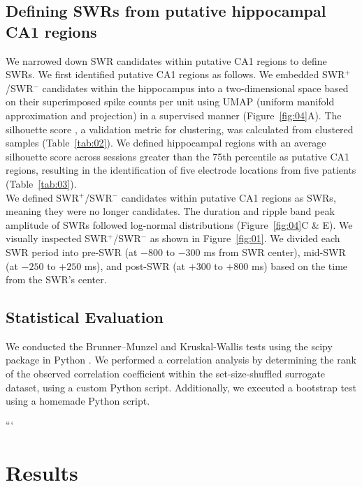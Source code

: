 \documentclass[final,3p,times,twocolumn]{elsarticle}
\begin{document}
\subsection{Defining SWRs from putative hippocampal CA1 regions}
We narrowed down SWR candidates within putative CA1 regions to define SWRs. We first identified putative CA1 regions as follows. We embedded SWR$^+$/SWR$^-$ candidates within the hippocampus into a two-dimensional space based on their superimposed spike counts per unit using UMAP (uniform manifold approximation and projection) \cite{mcinnes_umap_2018} in a supervised manner (Figure~\ref{fig:04}A). The silhouette score \cite{rousseeuw_silhouettes_1987}, a validation metric for clustering, was calculated from clustered samples (Table~\ref{tab:02}). We defined hippocampal regions with an average silhouette score across sessions greater than the 75th percentile as putative CA1 regions, resulting in the identification of five electrode locations from five patients (Table~\ref{tab:03}).
\\
\indent
We defined SWR$^+$/SWR$^-$ candidates within putative CA1 regions as SWRs, meaning they were no longer candidates. The duration and ripple band peak amplitude of SWRs followed log-normal distributions (Figure~\ref{fig:04}C \& E). We visually inspected SWR$^+$/SWR$^-$ as shown in Figure~\ref{fig:01}. We divided each SWR period into pre-SWR (at $-800$ to $-300$ ms from SWR center), mid-SWR (at $-250$ to $+250$ ms), and post-SWR (at $+300$ to $+800$ ms) based on the time from the SWR's center.

\subsection{Statistical Evaluation}
We conducted the Brunner--Munzel and Kruskal-Wallis tests using the scipy package in Python \cite{virtanen_scipy_2020}. We performed a correlation analysis by determining the rank of the observed correlation coefficient within the set-size-shuffled surrogate dataset, using a custom Python script. Additionally, we executed a bootstrap test using a homemade Python script.

\label{sec:methods}
```%
\section{Results}
\end{document}
